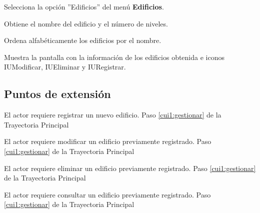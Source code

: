 \begin{UCtrayectoria}
	
	\UCpaso [\UCactor] Selecciona la opción ''Edificios'' del menú \textbf{Edificios}. %
	
	\UCpaso [\UCsist] Obtiene el nombre del edificio y el número de niveles.
	
	\UCpaso [\UCsist] Ordena alfabéticamente los edificios por el nombre.
	
	\UCpaso[\UCsist] Muestra la pantalla  con la información de los edificios obtenida e iconos IUModificar, IUEliminar y IURegistrar. 
	\label{cui1:gestionar}
\end{UCtrayectoria}

\subsection{Puntos de extensión}

\UCExtensionPoint 
{El actor requiere registrar un nuevo edificio.}
{Paso \ref{cui1:gestionar} de la Trayectoria Principal}
{}

\UCExtensionPoint 
{El actor requiere modificar un edificio previamente registrado.}
{Paso \ref{cui1:gestionar} de la Trayectoria Principal}
{}

\UCExtensionPoint 
{El actor requiere eliminar un edificio previamente registrado.}
{Paso \ref{cui1:gestionar} de la Trayectoria Principal}
{}

\UCExtensionPoint 
{El actor requiere consultar un edificio previamente registrado.}
{Paso \ref{cui1:gestionar} de la Trayectoria Principal}
{}

